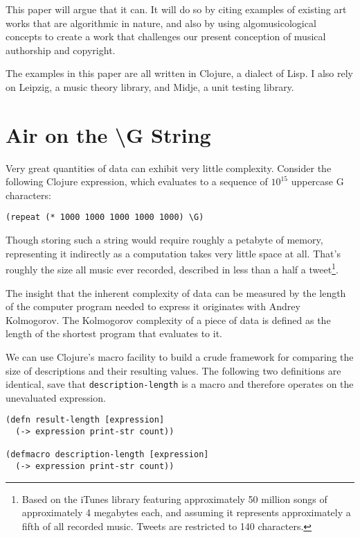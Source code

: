 \documentclass[numbers, preprint]{sigplanconf}
\begin{document}
This paper will argue that it can. It will do so by citing examples of existing art works that are algorithmic in nature, and
also by using algomusicological concepts to create a work that challenges our present conception of musical authorship and
copyright.

The examples in this paper are all written in Clojure\cite{Clojure}, a dialect of Lisp. I also rely on Leipzig\cite{Leipzig},
a music theory library, and Midje\cite{Midje}, a unit testing library.

\section{Air on the {\textbackslash}G String\cite{Air on the G String}}
Very great quantities of data can exhibit very little complexity. Consider the following Clojure expression, which
evaluates to a sequence of $10^{15}$ uppercase G characters:

\begin{verbatim}
(repeat (* 1000 1000 1000 1000 1000) \G)
\end{verbatim}

Though storing such a string would require roughly a petabyte of memory, representing it indirectly as a computation
takes very little space at all. That's roughly the size all music ever recorded,
described in less than a half a tweet\footnote{Based on the iTunes library featuring approximately 50 million songs
of approximately 4 megabytes each, and assuming it represents approximately a fifth of all recorded music. Tweets are
restricted to 140 characters.}.

The insight that the inherent complexity of data can be measured by the length of the computer program needed to express it
originates with Andrey Kolmogorov\cite{On Tables of Random Numbers}. The Kolmogorov complexity of a piece of data is defined
as the length of the shortest program that evaluates to it.

We can use Clojure's macro facility to build a crude framework for comparing the size of descriptions and their
resulting values. The following two definitions are identical, save that \verb|description-length| is a macro and therefore
operates on the unevaluated expression.

\begin{verbatim}
(defn result-length [expression]
  (-> expression print-str count))

(defmacro description-length [expression]
  (-> expression print-str count))
\end{verbatim}
\end{document}
